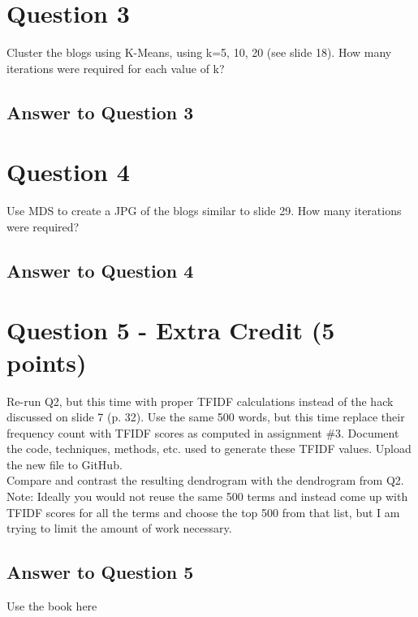 \documentclass{article}
\begin{document}
\newpage
\section*{Question 3}
Cluster the blogs using K-Means, using k=5, 10, 20 (see slide 18). How many iterations were required for each value of k?

\subsection*{Answer to Question 3}


\newpage
\section*{Question 4}
Use MDS to create a JPG of the blogs similar to slide 29. How many iterations were required?

\subsection*{Answer to Question 4}

\newpage
\section*{Question 5 - Extra Credit (5 points)}
Re-run Q2, but this time with proper TFIDF calculations instead of the hack discussed on slide 7 (p. 32). Use the same 500 words, but this time replace their frequency count with TFIDF scores as computed in assignment \#3. Document the code, techniques, methods, etc. used to generate these TFIDF values. Upload the new file to GitHub. \\

Compare and contrast the resulting dendrogram with the dendrogram from Q2. \\

Note: Ideally you would not reuse the same 500 terms and instead come up with TFIDF scores for all the terms and choose the top 500 from that list, but I am trying to limit the amount of work necessary.

\subsection*{Answer to Question 5}

Use the book here \cite{pci}

\end{document}
